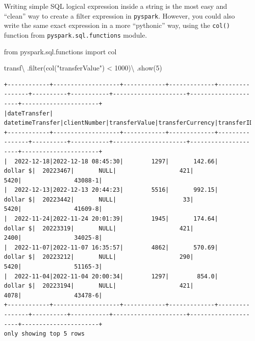 \documentclass[
  11pt,
  letterpaper,
  DIV=11,
  numbers=noendperiod]{scrreprt}
\newenvironment{Shaded}{\begin{snugshade}}{\end{snugshade}}
\newcommand{\BuiltInTok}[1]{\textcolor[rgb]{0.00,0.23,0.31}{#1}}
\newcommand{\DecValTok}[1]{\textcolor[rgb]{0.68,0.00,0.00}{#1}}
\newcommand{\ImportTok}[1]{\textcolor[rgb]{0.00,0.46,0.62}{#1}}
\newcommand{\NormalTok}[1]{\textcolor[rgb]{0.00,0.23,0.31}{#1}}
\newcommand{\OperatorTok}[1]{\textcolor[rgb]{0.37,0.37,0.37}{#1}}
\newcommand{\StringTok}[1]{\textcolor[rgb]{0.13,0.47,0.30}{#1}}
\begin{document}
Writing simple SQL logical expression inside a string is the most easy
and ``clean'' way to create a filter expression in \texttt{pyspark}.
However, you could also write the same exact expression in a more
``pythonic'' way, using the \texttt{col()} function from
\texttt{pyspark.sql.functions} module.

\begin{Shaded}
\begin{Highlighting}[]
\ImportTok{from}\NormalTok{ pyspark.sql.functions }\ImportTok{import}\NormalTok{ col}

\NormalTok{transf}\OperatorTok{\textbackslash{}}
\NormalTok{  .}\BuiltInTok{filter}\NormalTok{(col(}\StringTok{"transferValue"}\NormalTok{) }\OperatorTok{\textless{}} \DecValTok{1000}\NormalTok{)}\OperatorTok{\textbackslash{}}
\NormalTok{  .show(}\DecValTok{5}\NormalTok{)}
\end{Highlighting}
\end{Shaded}

\begin{verbatim}
+------------+-------------------+------------+-------------+----------------+----------+-----------+---------------------+---------------------+----------------------+
|dateTransfer|   datetimeTransfer|clientNumber|transferValue|transferCurrency|transferID|transferLog|destinationBankNumber|destinationBankBranch|destinationBankAccount|
+------------+-------------------+------------+-------------+----------------+----------+-----------+---------------------+---------------------+----------------------+
|  2022-12-18|2022-12-18 08:45:30|        1297|       142.66|        dollar $|  20223467|       NULL|                  421|                 5420|               43088-1|
|  2022-12-13|2022-12-13 20:44:23|        5516|       992.15|        dollar $|  20223442|       NULL|                   33|                 5420|               41609-8|
|  2022-11-24|2022-11-24 20:01:39|        1945|       174.64|        dollar $|  20223319|       NULL|                  421|                 2400|               34025-8|
|  2022-11-07|2022-11-07 16:35:57|        4862|       570.69|        dollar $|  20223212|       NULL|                  290|                 5420|               51165-3|
|  2022-11-04|2022-11-04 20:00:34|        1297|        854.0|        dollar $|  20223194|       NULL|                  421|                 4078|               43478-6|
+------------+-------------------+------------+-------------+----------------+----------+-----------+---------------------+---------------------+----------------------+
only showing top 5 rows
\end{verbatim}
\end{document}
